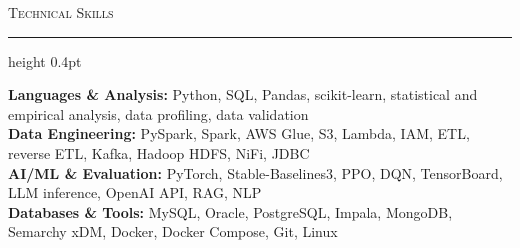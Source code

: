 \documentclass[letterpaper,11pt]{article}
\newcommand{\resumesection}[1]{%
  \par\vspace{2pt}%
  {\large\scshape #1}\par\vspace{2pt}%
  \hrule height 0.4pt\vspace{2pt}%
}
\begin{document}
\resumesection{Technical Skills}
\textbf{Languages \& Analysis:} Python, SQL, Pandas, scikit-learn, statistical and empirical analysis, data profiling, data validation\\
\textbf{Data Engineering:} PySpark, Spark, AWS Glue, S3, Lambda, IAM, ETL, reverse ETL, Kafka, Hadoop HDFS, NiFi, JDBC\\
\textbf{AI/ML \& Evaluation:} PyTorch, Stable-Baselines3, PPO, DQN, TensorBoard, LLM inference, OpenAI API, RAG, NLP\\
\textbf{Databases \& Tools:} MySQL, Oracle, PostgreSQL, Impala, MongoDB, Semarchy xDM, Docker, Docker Compose, Git, Linux
\end{document}
